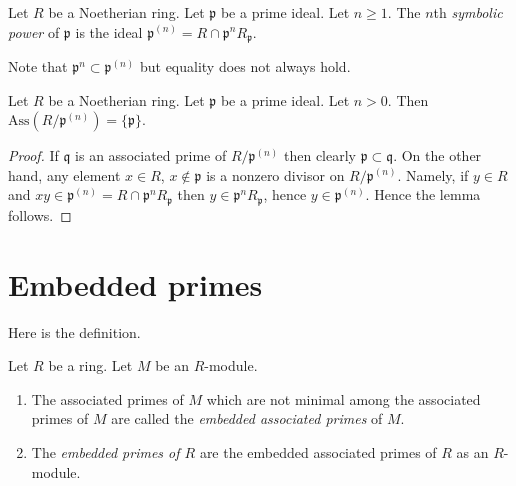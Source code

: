 \begin{definition}
\label{definition-symbolic-power}
Let $R$ be a Noetherian ring.
Let $\mathfrak p$ be a prime ideal.
Let $n \geq 1$. The $n$th {\it symbolic power} of $\mathfrak p$
is the ideal $\mathfrak p^{(n)} = R \cap \mathfrak p^nR_{\mathfrak p}$.
\end{definition}

\noindent
Note that $\mathfrak p^n \subset \mathfrak p^{(n)}$ but equality does
not always hold.

\begin{lemma}
\label{lemma-symbolic-power-associated}
Let $R$ be a Noetherian ring.
Let $\mathfrak p$ be a prime ideal.
Let $n > 0$. Then $\text{Ass}(R/\mathfrak p^{(n)}) = \{\mathfrak p\}$.
\end{lemma}

\begin{proof}
If $\mathfrak q$ is an associated prime of $R/\mathfrak p^{(n)}$
then clearly $\mathfrak p \subset \mathfrak q$.
On the other hand, any element $x \in R$, $x \not \in \mathfrak p$
is a nonzero divisor on $R/\mathfrak p^{(n)}$.
Namely, if $y \in R$ and
$xy \in \mathfrak p^{(n)} = R \cap \mathfrak p^nR_{\mathfrak p}$
then $y \in \mathfrak p^nR_{\mathfrak p}$, hence $y \in \mathfrak p^{(n)}$.
Hence the lemma follows.
\end{proof}












\section{Embedded primes}
\label{section-embedded-primes}

\noindent
Here is the definition.

\begin{definition}
\label{definition-embedded-primes}
Let $R$ be a ring.
Let $M$ be an $R$-module.
\begin{enumerate}
\item  The associated primes of $M$ which are
not minimal among the associated primes of $M$ are called the
{\it embedded associated primes} of $M$.
\item The {\it embedded primes of $R$}
are the embedded associated primes of $R$ as an $R$-module.
\end{enumerate}
\end{definition}

